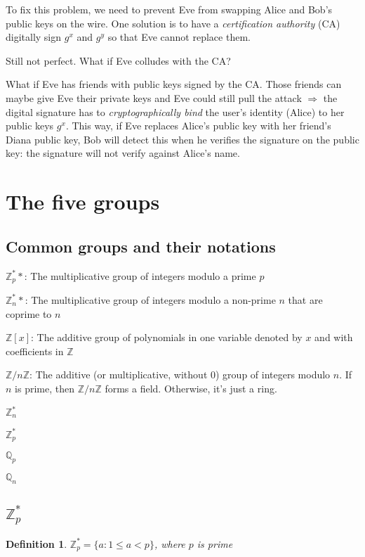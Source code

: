 \documentclass[12pt]{article}
\newtheorem{definition}[thm]{Definition}
\newcommand{\Zp}{\mathbb{Z}^{\ast}_p}
\newcommand{\Zn}{\mathbb{Z}^{\ast}_n}
\newcommand{\Znz}{\mathbb{Z}/n\mathbb{Z}}
\newcommand{\Qp}{\mathbb{Q}_p}
\newcommand{\Qn}{\mathbb{Q}_n}
\begin{document}
To fix this problem, we need to prevent Eve from swapping Alice and Bob's public
keys on the wire. One solution is to have a \emph{certification authority} (CA)
digitally sign $g^x$ and $g^y$ so that Eve cannot replace them.

\begin{note}
Still not perfect. What if Eve colludes with the CA?
\end{note}

\begin{note}
What if Eve has friends with public keys signed by the CA. Those friends can maybe give Eve their private keys and Eve could still pull the attack $\Rightarrow$ the
digital signature has to \emph{cryptographically bind} the user's identity (Alice)
to her public keys $g^x$. This way, if Eve replaces Alice's public key with
her friend's Diana public key, Bob will detect this when he verifies the signature
on the public key: the signature will not verify against Alice's name.
\end{note}

\section{The five groups}

\subsection{Common groups and their notations}

$\Zp*$: The multiplicative group of integers modulo a prime $p$

$\Zn*$: The multiplicative group of integers modulo a non-prime $n$ that are coprime to $n$

$\mathbb{Z}[x]$: The additive group of polynomials in one variable denoted by
$x$ and with coefficients in $\mathbb{Z}$

$\Znz$: The additive (or multiplicative, without $0$) group of integers
modulo $n$. If $n$ is prime, then $\Znz$ forms a field. Otherwise, it's just
a ring.

$\Zn$

$\Zp$

$\Qp$

$\Qn$

\subsection{$\Zp$}
\begin{definition}
$\Zp = \{ a : 1 \le a < p\}$, where $p$ is prime
\end{definition}
\end{document}
